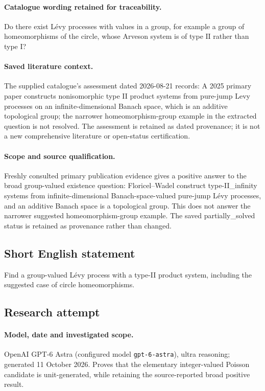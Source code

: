 \documentclass[11pt]{article}
\begin{document}
\paragraph{Catalogue wording retained for traceability.}
Do there exist Lévy processes with values in a group, for example a group of homeomorphisms of the circle, whose Arveson system is of type $\mathrm{II}$ rather than type $\mathrm I$?

\paragraph{Saved literature context.} The supplied catalogue's assessment dated 2026-08-21 records: A 2025 primary paper constructs nonisomorphic type II product systems from pure-jump Levy processes on an infinite-dimensional Banach space, which is an additive topological group; the narrower homeomorphism-group example in the extracted question is not resolved. The assessment is retained as dated provenance; it is not a new comprehensive literature or open-status certification.
\paragraph{Scope and source qualification.}Freshly consulted primary publication evidence gives a positive answer to the broad group-valued existence question: Floricel--Wadel construct type-II_infinity systems from infinite-dimensional Banach-space-valued pure-jump Lévy processes, and an additive Banach space is a topological group. This does not answer the narrower suggested homeomorphism-group example. The saved partially_solved status is retained as provenance rather than changed.
\subsection{Short English statement}
Find a group-valued Lévy process with a type-II product system, including the suggested case of circle homeomorphisms.
\subsection{Research attempt}
\paragraph{Model, date and investigated scope.}
OpenAI GPT-6 Astra (configured model \texttt{gpt-6-astra}), ultra reasoning; generated 11 October 2026. Proves that the elementary integer-valued Poisson candidate is unit-generated, while retaining the source-reported broad positive result.
\end{document}
